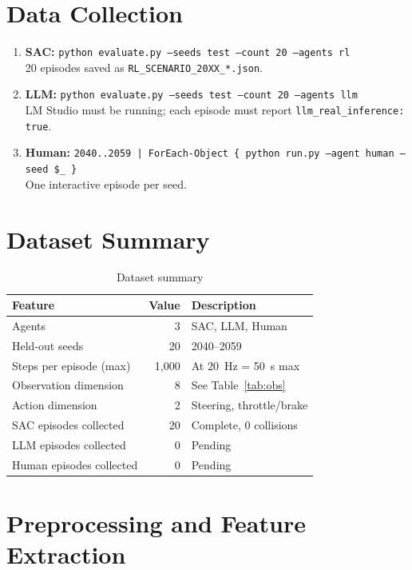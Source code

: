 \documentclass[12pt,a4paper]{report}
\begin{document}
\section{Data Collection}

\begin{enumerate}
  \item \textbf{SAC:} \texttt{python evaluate.py --seeds test --count 20 --agents rl} \\
        20 episodes saved as \texttt{RL\_SCENARIO\_20XX\_*.json}.
  \item \textbf{LLM:} \texttt{python evaluate.py --seeds test --count 20 --agents llm} \\
        LM Studio must be running; each episode must report \texttt{llm\_real\_inference: true}.
  \item \textbf{Human:} \texttt{2040..2059 | ForEach-Object \{ python run.py --agent human --seed \$\_ \}} \\
        One interactive episode per seed.
\end{enumerate}

\section{Dataset Summary}

\begin{table}[H]
\centering
\caption{Dataset summary}
\label{tab:dataset}
\begin{tabular}{lrp{7cm}}
\toprule
Feature & Value & Description \\
\midrule
Agents & 3 & SAC, LLM, Human \\
Held-out seeds & 20 & 2040--2059 \\
Steps per episode (max) & 1,000 & At 20~Hz = 50~s max \\
Observation dimension & 8 & See Table~\ref{tab:obs} \\
Action dimension & 2 & Steering, throttle/brake \\
SAC episodes collected & 20 & Complete, 0 collisions \\
LLM episodes collected & 0 & Pending \\
Human episodes collected & 0 & Pending \\
\bottomrule
\end{tabular}
\end{table}

\section{Preprocessing and Feature Extraction}
\end{document}
